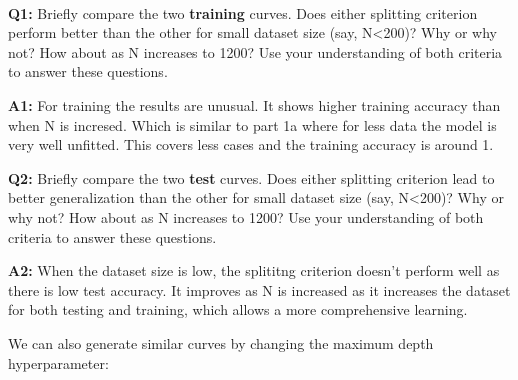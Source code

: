 \documentclass[11pt]{article}
\begin{document}
    \begin{center}
    \end{center}
    { \hspace*{\fill} \\}
    
    \textbf{Q1:} Briefly compare the two \textbf{training} curves. Does
either splitting criterion perform better than the other for small
dataset size (say, N\textless{}200)? Why or why not? How about as N
increases to 1200? Use your understanding of both criteria to answer
these questions.

    \textbf{A1:} For training the results are unusual. It shows higher
training accuracy than when N is incresed. Which is similar to part 1a
where for less data the model is very well unfitted. This covers less
cases and the training accuracy is around 1.

    \textbf{Q2:} Briefly compare the two \textbf{test} curves. Does either
splitting criterion lead to better generalization than the other for
small dataset size (say, N\textless{}200)? Why or why not? How about as
N increases to 1200? Use your understanding of both criteria to answer
these questions.

    \textbf{A2:} When the dataset size is low, the splititng criterion
doesn't perform well as there is low test accuracy. It improves as N is
increased as it increases the dataset for both testing and training,
which allows a more comprehensive learning.

    We can also generate similar curves by changing the maximum depth
hyperparameter:
\end{document}
